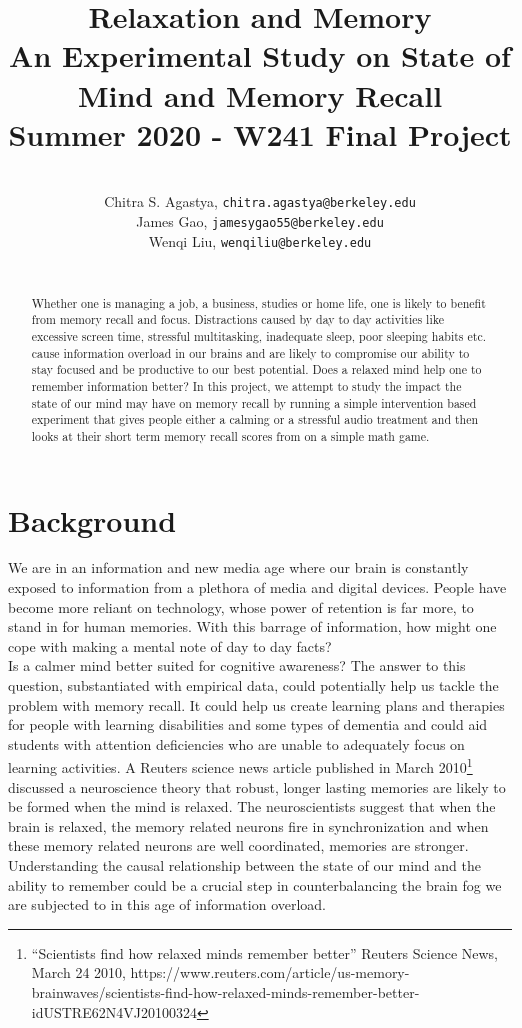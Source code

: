 \documentclass[journal,onecolumn, 12pt]{article}
\title{Relaxation and Memory \\
\large An Experimental Study on State of Mind and Memory Recall \\
\medium Summer 2020 - W241 Final Project}
\author{
\\
{Chitra S. Agastya,  \tt chitra.agastya@berkeley.edu} \\
{James Gao, \tt jamesygao55@berkeley.edu}\\
{Wenqi Liu, \tt wenqiliu@berkeley.edu}\\
\\
}
\begin{document}
\setlength{\belowcaptionskip}{-10pt}
\setlength{\abovedisplayskip}{-10pt}
\setlength{\belowdisplayskip}{-10pt}

\maketitle
\begin{abstract}

\noindent
Whether one is managing a job, a business, studies or home life, one is likely to benefit from memory recall and focus. Distractions caused by day to day activities like excessive screen time,  stressful multitasking, inadequate sleep, poor sleeping habits etc. cause information overload in our brains and are likely to compromise our ability to stay focused and be productive to our best potential. Does a relaxed mind help one to remember information better? In this project, we attempt to study the impact the state of our mind may have on memory recall by running a simple intervention based experiment that gives people either a calming or a stressful audio treatment and then looks at their short term memory recall scores from on a simple math game.

\end{abstract}

\section{Background}

We are in an information and new media age where our brain is constantly exposed to information from a plethora of media and digital devices. People have become more reliant on technology, whose power of retention is far more, to stand in for human memories. With this barrage of information, how might one cope with making a mental note of day to day facts? \\

\noindent
Is a calmer mind better suited for cognitive awareness? The answer to this question, substantiated with empirical data, could potentially help us tackle the problem with memory recall. It could help us create learning plans and therapies for people with learning disabilities and some types of dementia and could aid students with attention deficiencies who are unable to adequately focus on learning activities. A Reuters science news article published in March 2010\footnote {“Scientists find how relaxed minds remember better” Reuters Science News, March 24 2010,
https://www.reuters.com/article/us-memory-brainwaves/scientists-find-how-relaxed-minds-remember-better-idUSTRE62N4VJ20100324
} discussed a neuroscience theory that robust, longer lasting memories are likely to be formed when the mind is relaxed. The neuroscientists suggest that when the brain is relaxed, the memory related neurons fire in synchronization and when these memory related neurons are well coordinated, memories are stronger. Understanding the causal relationship between the state of our mind and the ability to remember could be a crucial step in counterbalancing the brain fog we are subjected to in this age of information overload. 
\end{document}
